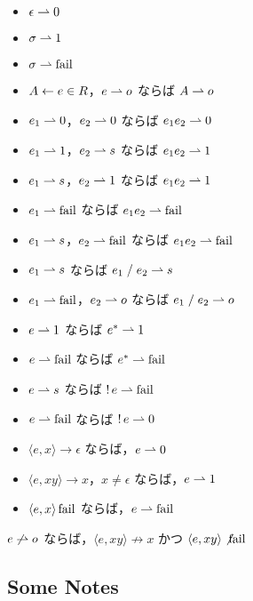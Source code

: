 \begin{itemize}
  \item $\epsilon \rightharpoonup 0$
  \item $\sigma \rightharpoonup 1$
  \item $\sigma \rightharpoonup \mathop{\mathrm{fail}}$
  \item $A \gets e \in R$，$e \rightharpoonup o$ ならば $A \rightharpoonup o$
  \item $e_1 \rightharpoonup 0$，$e_2 \rightharpoonup 0$ ならば $e_1e_2 \rightharpoonup 0$
  \item $e_1 \rightharpoonup 1$，$e_2 \rightharpoonup s$ ならば $e_1e_2 \rightharpoonup 1$
  \item $e_1 \rightharpoonup s$，$e_2 \rightharpoonup 1$ ならば $e_1e_2 \rightharpoonup 1$
  \item $e_1 \rightharpoonup \mathop{\mathrm{fail}}$ ならば $e_1e_2 \rightharpoonup \mathop{\mathrm{fail}}$
  \item $e_1 \rightharpoonup s$，$e_2 \rightharpoonup \mathop{\mathrm{fail}}$ ならば $e_1e_2 \rightharpoonup \mathop{\mathrm{fail}}$
  \item $e_1 \rightharpoonup s$ ならば $e_1 \mathrel{/} e_2 \rightharpoonup s$
  \item $e_1 \rightharpoonup \mathop{\mathrm{fail}}$，$e_2 \rightharpoonup o$ ならば $e_1 \mathrel{/} e_2 \rightharpoonup o$
  \item $e \rightharpoonup 1$ ならば $e^* \rightharpoonup 1$
  \item $e \rightharpoonup \mathop{\mathrm{fail}}$ ならば $e^* \rightharpoonup \mathop{\mathrm{fail}}$
  \item $e \rightharpoonup s$ ならば $\mathop{!} e \rightharpoonup \mathop{\mathrm{fail}}$
  \item $e \rightharpoonup \mathop{\mathrm{fail}}$ ならば $\mathop{!} e \rightharpoonup 0$
\end{itemize}

\begin{theorem}
  \hwordspace{}
  \begin{itemize}
    \item $\langle e, x\rangle \to \epsilon$ ならば，$e \rightharpoonup 0$
    \item $\langle e, xy\rangle \to x$，$x \neq \epsilon$ ならば，$e \rightharpoonup 1$
    \item $\langle e, x\rangle \mathop{\mathrm{fail}}$ ならば，$e \rightharpoonup \mathop{\mathrm{fail}}$
  \end{itemize}
\end{theorem}

\begin{corollary}
  $e \not\rightharpoonup o$ ならば，$\langle e, xy\rangle \not\to x$ かつ $\langle e, xy\rangle \not{\mathop{\mathrm{fail}}}$
\end{corollary}

\subsection{Some Notes}

